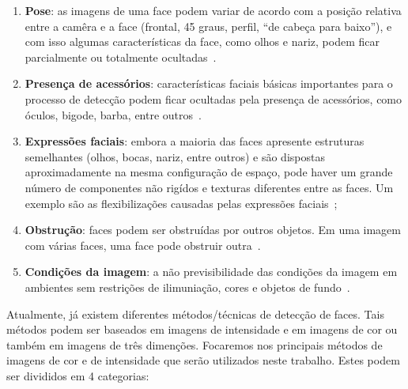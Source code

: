 	\begin{enumerate}
		\item \textbf{Pose}: as imagens de uma face podem variar de acordo com a posição relativa entre a camêra e a face (frontal, 45 graus, perfil, ``de cabeça para baixo''), e com isso algumas características da face, como olhos e nariz, podem ficar parcialmente ou totalmente ocultadas~\cite{yang}.
		\item \textbf{Presença de acessórios}: características faciais básicas importantes para o processo de detecção podem ficar ocultadas pela presença de acessórios, como óculos, bigode, barba, entre outros~\cite{oliveira, yang}. 
		\item \textbf{Expressões faciais}: embora a maioria das faces apresente estruturas semelhantes (olhos, bocas, nariz, entre outros) e são dispostas aproximadamente na mesma configuração de espaço, pode haver um grande número de componentes não rigídos e texturas diferentes entre as faces. Um exemplo são as flexibilizações causadas pelas expressões faciais~\cite{oliveira, yang};
		\item \textbf{Obstrução}: faces podem ser obstruídas por outros objetos. Em uma imagem com várias faces, uma face pode obstruir outra~\cite{yang}.
		\item \textbf{Condições da imagem}: a não previsibilidade das condições da imagem em ambientes sem restrições de ilimuniação, cores e objetos de fundo~\cite{oliveira, yang}.
	\end{enumerate}

Atualmente, já existem diferentes métodos/técnicas de detecção de faces. Tais métodos podem ser baseados em imagens de intensidade e em imagens de cor ou também em imagens de três dimenções. Focaremos nos principais métodos de imagens de cor e de intensidade que serão utilizados neste trabalho. Estes podem ser divididos em 4 categorias:

